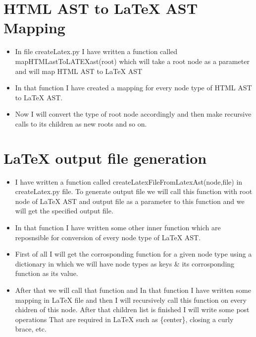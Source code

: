 \documentclass{article}
\begin{document}
\section{HTML AST to LaTeX AST Mapping
}
\begin{itemize}
\item In file createLatex.py I have written a function called mapHTMLastToLATEXast(root) which will take a root node as a parameter and will map HTML AST to LaTeX AST

\item In that function I have created a mapping for every node type of HTML AST to LaTeX AST.

\item Now I will convert the type of root node accordingly and then make recursive calls to its children as new roots and so on.

\end{itemize}
\section{LaTeX output file generation
}
\begin{itemize}
\item I have written a function called createLatexFileFromLatexAst(node,file) in createLatex.py file. To generate output file we will call this function with root node of LaTeX AST and output file as a parameter to this function and we will get the specified output file.

\item In that function I have written some other inner function which are reposnsible for conversion of every node type of LaTeX AST.

\item First of all I will get the corrosponding function for a given node type using a dictionary in which we will have node types as keys \& its corrosponding function as its value.

\item After that we will call that function and In that function I have written some mapping in LaTeX file and then I will recursively call this function on every chidren of this node. After that children list is finished I will write some post operations That are required in LaTeX such as \textbackslashend\{center\}, closing a curly brace, etc. 

\end{itemize}

%
%  

%
%
\end{document}
